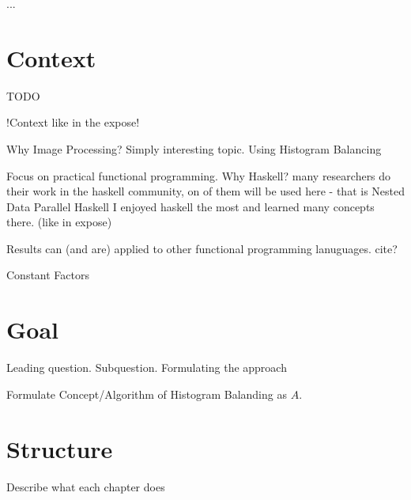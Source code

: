 
...

\section{Context}
  TODO
  
  !Context like in the expose!
  
  Why Image Processing? Simply interesting topic. Using Histogram Balancing
  
  
  Focus on practical functional programming.
    Why Haskell?
    many researchers do their work in the haskell community,
      on of them will be used here - that is Nested Data Parallel Haskell
    I enjoyed haskell the most and learned many concepts there. (like in expose)
    
    Results can (and are) applied to other functional programming
    lanuguages. cite? 
    
    
    Constant Factors

\section{Goal}
  Leading question. Subquestion.
  Formulating the approach
  
  Formulate Concept/Algorithm of Histogram Balanding as $A$.

\section{Structure}
  Describe what each chapter does

